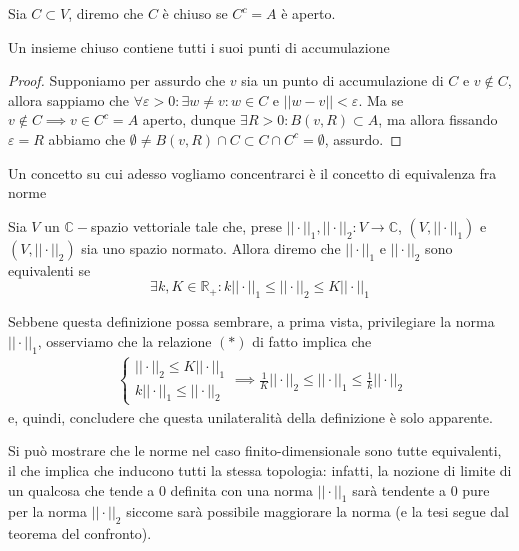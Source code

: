 \documentclass[12pt, twoside, italian, openany]{book}
\begin{document}
	\begin{definition}
		Sia $C \subset V$, diremo che $C$ è chiuso se $C^c = A$ è aperto.
	\end{definition}
	\begin{prop}
		Un insieme chiuso contiene tutti i suoi punti di accumulazione
	\end{prop}
	\begin{proof}
	Supponiamo per assurdo che $v$ sia un punto di accumulazione di $C$ e $v \not\in C$, allora sappiamo che $\forall \varepsilon > 0: \exists w \neq v: w \in C \text{ e } ||w - v||< \varepsilon$. Ma se $v \not\in C \implies v \in C^c = A$ aperto, dunque $\exists R > 0: B(v, R) \subset A$, ma allora fissando $\varepsilon = R$ abbiamo che $\emptyset \neq B(v, R) \cap C \subset C \cap C^c = \emptyset$, assurdo.
	\end{proof}
	Un concetto su cui adesso vogliamo concentrarci è il concetto di equivalenza fra norme
	\begin{definition}
		Sia $V$ un $\mathbb{C}-$spazio vettoriale tale che, prese $||\cdot||_1, ||\cdot||_2 : V \to \mathbb{C}$, $(V, ||\cdot||_1)$ e $(V, ||\cdot||_2)$ sia uno spazio normato. Allora diremo che $||\cdot||_1$ e $||\cdot||_2$ sono equivalenti se
		\begin{equation*}
		\exists k, K \in \mathbb{R}_+ : k ||\cdot||_1 \leq ||\cdot||_2 \leq K ||\cdot||_1 \tag{$\ast$}
		\end{equation*}
	\end{definition}
	\begin{remark}
		Sebbene questa definizione possa sembrare, a prima vista, privilegiare la norma $||\cdot||_1$, osserviamo che la relazione $(\ast)$ di fatto implica che
		\begin{align*}
			\begin{cases}
				||\cdot||_2 \leq K ||\cdot||_1 \\
				k ||\cdot||_1 \leq ||\cdot||_2
			\end{cases} \implies \frac{1}{K} ||\cdot||_2 \leq ||\cdot||_1 \leq \frac{1}{k} ||\cdot||_2
		\end{align*}
		e, quindi, concludere che questa unilateralità della definizione è solo apparente. 
	\end{remark}
	Si può mostrare che le norme nel caso finito-dimensionale sono tutte equivalenti, il che implica che inducono tutti la stessa topologia: infatti, la nozione di limite di un qualcosa che tende a $0$ definita
	con una norma $||\cdot||_1$ sarà tendente a $0$ pure per la norma $||\cdot||_2$ siccome sarà possibile maggiorare la norma (e la tesi segue dal teorema del confronto). \\
\end{document}
